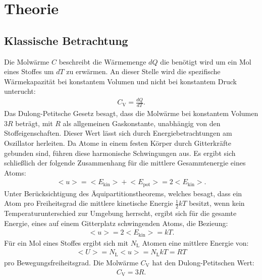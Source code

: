 \section{Theorie}
\label{sec:Theorie}

\cite{sample}
\subsection{Klassische Betrachtung}
Die Molwärme $C$ beschreibt die Wärmemenge $dQ$
die benötigt wird um ein Mol eines Stoffes um $dT$ zu erwärmen.
An dieser Stelle wird die spezifische Wärmekapazität bei konstantem Volumen und nicht bei
konstantem Druck unterucht:
\begin{align}
  C_{\mathrm{V}}=\frac{dQ}{dT}.
\end{align}
Das Dulong-Petitsche Gesetz besagt, dass die Molwärme bei konstantem Volumen
$3R$ beträgt, mit $R$ als allgemeinen Gaskonstante, unabhängig von den Stoffeigenschaften.
Dieser Wert lässt sich durch Energiebetrachtungen am Oszillator herleiten. Da Atome in einem
festen Körper durch Gitterkräfte gebunden sind, führen diese harmonische Schwingungen
aus. Es ergibt sich schließlich der folgende Zusammenhang für die mittlere Gesammtenergie
eines Atoms:
\begin{align}
  \bigl<u\bigr>=\bigl<E_{\mathrm{kin}}\bigr>+\bigl<E_{\mathrm{pot}}\bigr>=2\bigl<E_{\mathrm{kin}}\bigr>.
\end{align}
Unter Berücksichtigung des Äquipartitionstheorems, welches besagt, dass ein Atom
pro Freiheitsgrad die mittlere kinetische Energie $\frac{1}{2}kT$ besitzt,
wenn kein Temperaturunterschied zur Umgebung herrscht, ergibt sich für
die gesamte Energie, eines auf einem Gitterplatz schwingenden Atoms, die Bezieung:
\begin{align}
  \bigl<u\bigr>=2\bigl<E_{\mathrm{kin}}\bigr>=kT.
\end{align}
Für ein Mol eines Stoffes ergibt sich mit $N_\mathrm{L}$ Atomen eine mittlere Energie von:
\begin{align}
  \bigl<U\bigr>=N_{\mathrm{L}}\bigl<u\bigr>=N_{\mathrm{L}}kT=RT
\end{align}
pro Bewegungsfreiheitsgrad.
Die Molwärme $C_{\mathrm{V}}$ hat den Dulong-Petitschen Wert:
\begin{align}
  C_{\mathrm{V}}=3R.
\end{align}\\
